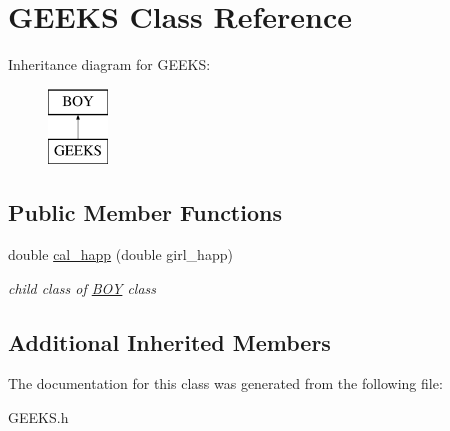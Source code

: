 \hypertarget{classGEEKS}{}\section{G\+E\+E\+KS Class Reference}
\label{classGEEKS}
Inheritance diagram for G\+E\+E\+KS\+:\begin{figure}[H]
\begin{center}
\leavevmode
\includegraphics[height=2.000000cm]{classGEEKS}
\end{center}
\end{figure}
\subsection*{Public Member Functions}
\begin{DoxyCompactItemize}
\item 
\mbox{\label{classGEEKS_a6425e88aeb8a0fb7e7502bf2b8a9f037}} 
double \hyperlink{classGEEKS_a6425e88aeb8a0fb7e7502bf2b8a9f037}{cal\+\_\+happ} (double girl\+\_\+happ)
\begin{DoxyCompactList}\small\item\em child class of \hyperlink{classBOY}{B\+OY} class \end{DoxyCompactList}\end{DoxyCompactItemize}
\subsection*{Additional Inherited Members}


The documentation for this class was generated from the following file\+:\begin{DoxyCompactItemize}
\item 
G\+E\+E\+K\+S.\+h\end{DoxyCompactItemize}
